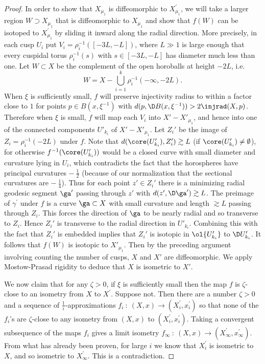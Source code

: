 \begin{proof}
In order to show that $X_{\mu_1}$ is diffeomorphic to
$X^\prime_{\mu_1}$, we will take a larger region
$W \supset X_{\mu_1}$ that is diffeomorphic to $X_{\mu_1}$
and show that $f(W)$ can be isotoped to $X^\prime_{\mu_1}$
by sliding it inward along the radial direction. More precisely,
in each cusp
$U_i$ put $V_i= \rho_i^{-1}([-3L,-L])$,
where $L\gg 1$ is large enough that  every cuspidal torus
$\rho_i^{-1}(s)$ with $s\in [-3L,-L]$ has diameter much less than one.
Let $W\subset X$ be the complement of the open horoballs
at height $-2L$, i.e.
\begin{equation}
W= X -  \bigcup_{i=1}^k  \rho_i^{-1}(-\infty, -2L).
\end{equation}
When $\xi$
is sufficiently small, $f$ will preserve injectivity radius
to within a factor close to $1$ for points $p\in B(x,\xi^{-1})$
with $d(p,\D B(x,\xi^{-1}))>2\injrad(X,p)$.  Therefore
when $\xi$ is small, $f$ will map each $V_i$ into
 $X' -  X'_{\mu_1}$, and hence into one of the
connected components $U'_{k_i}$ of $X' -  X'_{\mu_1}$.
Let $Z_i'$ be the image of $Z_i=\rho_i^{-1}(-2L)$ under $f$.   Note that
$d(\core(U'_{k_i}),Z_i')\gtrsim L$ (if $\core(U'_{k_i}) \neq
\emptyset$), for otherwise
$f^{-1}(\core(U'_{k_i}))$ would be a closed curve with
small diameter and curvature lying in $U_i$, which contradicts
the fact that the horospheres have principal curvatures
$- \: \frac12$ (because of our normalization that the sectional curvatures are
$- \: \frac14$). Thus
for each point $z'\in Z_i'$ there is a minimizing radial
geodesic segment $\ga'$ passing through $z'$ with
$d(z',\D\ga')\gtrsim L$.  The preimage of $\gamma^\prime$ under $f$ is
a curve $\ga\subset X$ with small curvature and length $\gtrsim L$
passing through $Z_i$. This forces the direction of $\ga$
to be nearly radial
and so transverse to $Z_i$.
Hence $Z_i'$ is transverse to the radial direction in
$U'_{k_i}$.  Combining this with the  fact that $Z_i'$ is
embedded  implies that $Z_i'$ is isotopic in $\ol{U'_{k_i}}$ to
$\D U'_{k_i}$.  It follows that $f(W)$
is isotopic to $X'_{\mu_1}$. Then by the preceding argument
involving counting the number of cusps,
$X$ and $X'$ are diffeomorphic.
We apply Mostow-Prasad rigidity \cite{Mostow,Prasad} to deduce that
$X$ is isometric to $X'$.

We now claim that for any $\zeta > 0$, if $\xi$
is sufficiently small then the map $f$ is $\zeta$-close to an
isometry from $X$ to $X^\prime$. Suppose not.  Then there are a number $\zeta > 0$ and
a sequence of $\frac{1}{i}$-approximations $f_i \: : \: (X, x) \rightarrow (X^\prime_i, x^\prime_i)$
so that none of the $f_i$'s are $\zeta$-close to
any
isometry from
$(X, x)$ to $(X^\prime_i, x^\prime_i)$. Taking a convergent subsequence of
the maps $f_i$ gives a limit isometry
$f_\infty \: : \: (X, x) \rightarrow (X^\prime_\infty, x^\prime_\infty)$.
From what has already been proven,
for large $i$ we know that $X^\prime_i$ is isometric to $X$, and so isometric
to $X^\prime_\infty$.
This is a contradiction.
\end{proof}

